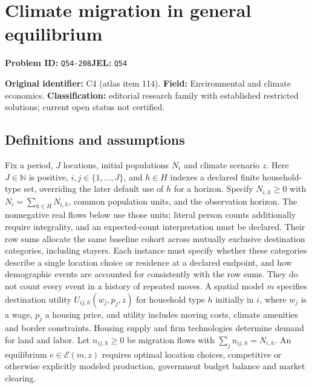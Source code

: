 \documentclass[11pt,a4paper]{article}
\newcommand{\N}{\mathbb N}
\begin{document}
\section*{Climate migration in general equilibrium}
\textbf{Problem ID:} \texttt{Q54-208}\quad \textbf{JEL:} \texttt{Q54}\par
\label{problem:OP-0114}
\label{audited:ECON-041}


\label{atlas:prob:C4}

\noindent\textbf{Original identifier:} C4 (atlas item 114). \textbf{Field:} Environmental and climate economics. \textbf{Classification:} editorial research family with established restricted solutions; current open status not certified.

\subsection*{Definitions and assumptions}

Fix a period, $J$ locations, initial populations $N_i$ and climate scenario $z$. Here $J\in\N$ is positive, $i,j\in\{1,\ldots,J\}$, and $h\in H$ indexes a declared finite household-type set, overriding the later default use of $h$ for a horizon. Specify $N_{i,h}\geq0$ with $N_i=\sum_{h\in H}N_{i,h}$, common population units, and the observation horizon. The nonnegative real flows below use those units; literal person counts additionally require integrality, and an expected-count interpretation must be declared. Their row sums allocate the same baseline cohort across mutually exclusive destination categories, including stayers. Each instance must specify whether these categories describe a single location choice or residence at a declared endpoint, and how demographic events are accounted for consistently with the row sums. They do not count every event in a history of repeated moves. A spatial model $m$ specifies destination utility $U_{ij,h}(w_j,p_j,z)$ for household type $h$ initially in $i$, where $w_j$ is a wage, $p_j$ a housing price, and utility includes moving costs, climate amenities and border constraints. Housing supply and firm technologies determine demand for land and labor. Let $n_{ij,h}\ge0$ be migration flows with $\sum_j n_{ij,h}=N_{i,h}$. An equilibrium $e\in\mathcal E(m,z)$ requires optimal location choices, competitive or otherwise explicitly modeled production, government budget balance and market clearing.
\end{document}
